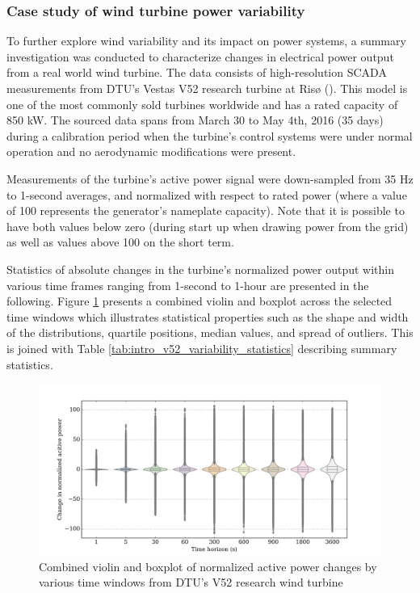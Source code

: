\clearpage
\subsubsection{Case study of wind turbine power variability}
\label{sec:intro_intermittency_V52}

To further explore wind variability and its impact on power systems, a summary investigation was conducted to characterize changes in electrical power output from a real world wind turbine. The data consists of high-resolution SCADA measurements from DTU's Vestas V52 research turbine at Ris{\o} (\cite{dtu_v52}). This model is one of the most commonly sold turbines worldwide and has a rated capacity of 850 kW. The sourced data spans from March 30 to May 4th, 2016 (35 days) during a calibration period when the turbine's control systems were under normal operation and no aerodynamic modifications were present. 

Measurements of the turbine's active power signal were down-sampled from 35 Hz to 1-second averages, and normalized with respect to rated power (where a value of 100 represents the generator's nameplate capacity). Note that it is possible to have both values below zero (during start up when drawing power from the grid) as well as values above 100 on the short term.

Statistics of absolute changes in the turbine's normalized power output within various time frames ranging from 1-second to 1-hour are presented in the following. Figure \ref{fig:act_pow_change_vioboxplot} presents a combined violin and boxplot across the selected time windows which illustrates statistical properties such as the shape and width of the distributions, quartile positions, median values, and spread of outliers. This is joined with Table \ref{tab:intro_v52_variability_statistics} describing summary statistics.

\begin{figure}[htbp]
    \centering
        \includegraphics[width=1.0\textwidth]{graphics/intro/variability/act_pow_change_vioboxplot.png}
    \caption{Combined violin and boxplot of normalized active power changes by various time windows from DTU's V52 research wind turbine}
    \label{fig:act_pow_change_vioboxplot}
\end{figure}

